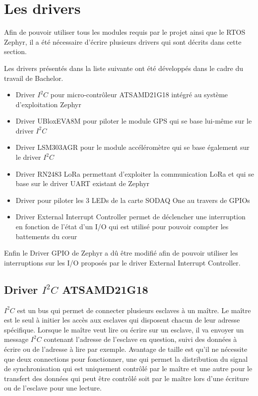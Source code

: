 \section{Les drivers}\label{ch:drivers}

Afin de pouvoir utiliser tous les modules requis par le projet ainsi que le RTOS Zephyr, il a été nécessaire d'écrire plusieurs drivers qui sont décrits dans cette section.

Les drivers présentés dans la liste suivante ont été développés dans le cadre du travail de Bachelor.

\begin{itemize}
\item Driver $I^{2}C$ pour micro-contrôleur ATSAMD21G18 intégré au système d'exploitation Zephyr
\item Driver UBloxEVA8M pour piloter le module GPS qui se base lui-même sur le driver $I^{2}C$
\item Driver LSM303AGR pour le module accéléromètre qui se base également sur le driver  $I^{2}C$
\item Driver RN2483 LoRa permettant d'exploiter la communication LoRa et qui se base sur le driver UART existant de Zephyr
\item Driver pour piloter les 3 LEDs de la carte SODAQ One au travers de GPIOs
\item Driver External Interrupt Controller permet de déclencher une interruption en fonction de l'état d'un I/O qui est utilisé pour pouvoir compter les battements du cœur
\end{itemize}

Enfin le Driver GPIO de Zephyr a dû être modifié afin de pouvoir utiliser les interruptions sur les I/O proposés par le driver External Interrupt Controller.

\subsection{Driver $I^{2}C$ ATSAMD21G18}

$I^{2}C$ est un bus qui permet de connecter plusieurs esclaves à un maître. Le maître est le seul à initier les accès aux esclaves qui disposent chacun de leur adresse spécifique. Lorsque le maître veut lire ou écrire sur un esclave, il va envoyer un message $I^{2}C$ contenant l'adresse de l'esclave en question, suivi des données à écrire ou de l'adresse à lire par exemple. Avantage de taille est qu'il ne nécessite que deux connections pour fonctionner, une qui permet la distribution du signal de synchronisation qui est uniquement contrôlé par le maître et une autre pour le transfert des données qui peut être contrôlé soit par le maître lors d'une écriture ou de l'esclave pour une lecture.

